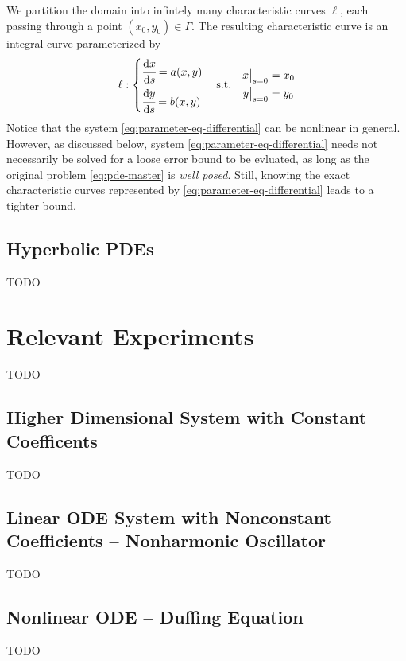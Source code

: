 \documentclass[accepted]{uai2023}
\newcommand{\ds}[1]{\cfrac{\mathrm{d} #1}{\mathrm{d} s}}
\begin{document}
    We partition the domain into infintely many characteristic curves $\ell$, each passing through a point $(x_0, y_0) \in \Gamma$. The resulting characteristic curve is an integral curve parameterized by
    \begin{equation} \label{eq:parameter-eq-differential}
        \ell: \begin{cases*}
            \ds{x} = a(x, y) \\
            \ds{y} = b(x, y) 
        \end{cases*} 
        \quad 
        \text{s.t.} 
        \quad
        \begin{aligned}
            x\big|_{s=0} &= x_0 \\
            y\big|_{s=0} &= y_0
        \end{aligned}
    \end{equation}
    Notice that the system \ref{eq:parameter-eq-differential} can be nonlinear in general. 
    However, as discussed below, system \ref{eq:parameter-eq-differential} needs not necessarily be solved for a loose error bound to be evluated, as long as the original problem \ref{eq:pde-master} is \textit{well posed}. 
    Still, knowing the exact characteristic curves represented by \ref{eq:parameter-eq-differential} leads to a tighter bound.

\subsection{Hyperbolic PDEs}
    TODO

\section{Relevant Experiments}\label{section:experiments}
    TODO

\subsection{Higher Dimensional System with Constant Coefficents} \label{section:high-dimension}
    TODO

\subsection{Linear ODE System with Nonconstant Coefficients -- Nonharmonic Oscillator} \label{section:experiment-nonharmonic-oscillator}
    TODO

\subsection{Nonlinear ODE -- Duffing Equation} \label{section:experiment-duffing}
    TODO
\end{document}
